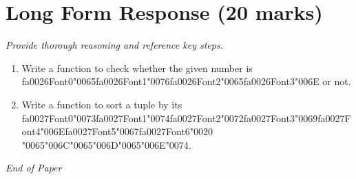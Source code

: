 \documentclass[12pt]{article}
\begin{document}
\section*{Long Form Response (20 marks)}
\textit{Provide thorough reasoning and reference key steps.}
\begin{enumerate}[label=\arabic*.]
\item Write a function to check whether the given number is {\csname fa0026Font0\endcsname\char"0065}{\csname fa0026Font1\endcsname\char"0076}{\csname fa0026Font2\endcsname\char"0065}{\csname fa0026Font3\endcsname\char"006E} or not.
\item Write a function to sort a tuple by its {\csname fa0027Font0\endcsname\char"0073}{\csname fa0027Font1\endcsname\char"0074}{\csname fa0027Font2\endcsname\char"0072}{\csname fa0027Font3\endcsname\char"0069}{\csname fa0027Font4\endcsname\char"006E}{\csname fa0027Font5\endcsname\char"0067}{\csname fa0027Font6\endcsname\char"0020} {\char"0065}{\char"006C}{\char"0065}{\char"006D}{\char"0065}{\char"006E}{\char"0074}.
\end{enumerate}

\vfill
\noindent\textit{End of Paper}
\end{document}
